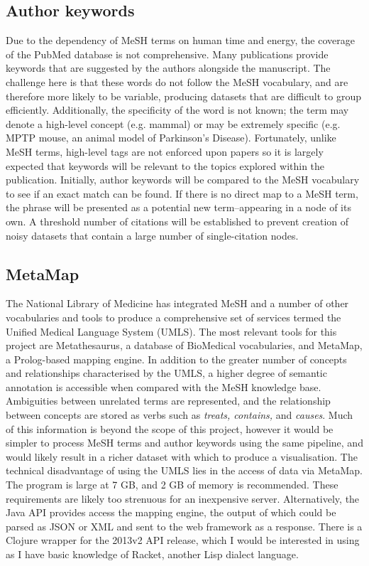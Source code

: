 \documentclass[PROP_AGutteridge_CS.tex]{subfiles}
\begin{document}
\subsection{Author keywords}
Due to the dependency of MeSH terms on human time and energy, the coverage of the PubMed database is not comprehensive. Many publications provide keywords that are suggested by the authors alongside the manuscript. The challenge here is that these words do not follow the MeSH vocabulary, and are therefore more likely to be variable, producing datasets that are difficult to group efficiently. Additionally, the specificity of the word is not known; the term may denote a high-level concept (e.g. mammal) or may be extremely specific (e.g. MPTP mouse, an animal model of Parkinson's Disease). Fortunately, unlike MeSH terms, high-level tags are not enforced upon papers so it is largely expected that keywords will be relevant to the topics explored within the publication. Initially, author keywords will be compared to the MeSH vocabulary to see if an exact match can be found. If there is no direct map to a MeSH term, the phrase will be presented as a potential new term--appearing in a node of its own. A threshold number of citations will be established to prevent creation of noisy datasets that contain a large number of single-citation nodes. 

\subsection{MetaMap}
The National Library of Medicine has integrated MeSH and a number of other vocabularies and tools to produce a comprehensive set of services termed the Unified Medical Language System (UMLS)\cite{bodenreider}. The most relevant tools for this project are Metathesaurus, a database of BioMedical vocabularies, and MetaMap, a Prolog-based mapping engine\cite{aronson}. In addition to the greater number of concepts and relationships characterised by the UMLS, a higher degree of semantic annotation is accessible when compared with the MeSH knowledge base. Ambiguities between unrelated terms are represented, and the relationship between concepts are stored as verbs such as \emph{treats, contains,} and \emph{causes}. Much of this information is beyond the scope of this project, however it would be simpler to process MeSH terms and author keywords using the same pipeline, and would likely result in a richer dataset with which to produce a visualisation. The technical disadvantage of using the UMLS lies in the access of data via MetaMap. The program is large at 7 GB, and 2 GB of memory is recommended. These requirements are likely too strenuous for an inexpensive server. Alternatively, the Java API provides access the mapping engine, the output of which could be parsed as JSON or XML and sent to the web framework as a response. There is a Clojure wrapper for the 2013v2 API release, which I would be interested in using as I have basic knowledge of Racket, another Lisp dialect language. 
\end{document}
